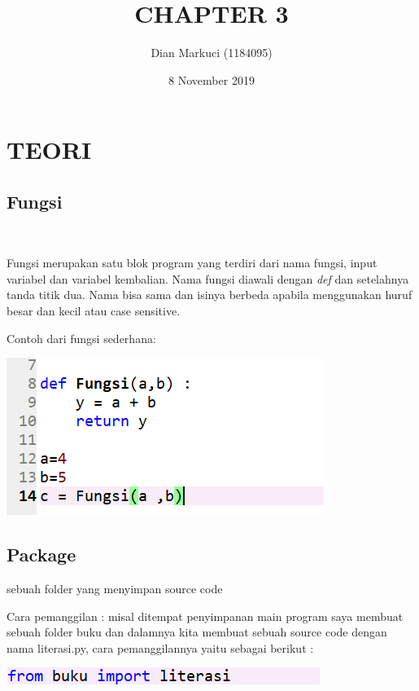 \documentclass{article}
\title{CHAPTER 3}
\author{Dian Markuci (1184095)}
\date{8 November 2019}
\begin{document}
\maketitle

\section{TEORI}
\subsection{Fungsi}\\
\item Fungsi merupakan satu blok program yang terdiri dari nama fungsi, input variabel dan variabel kembalian. Nama fungsi diawali dengan \textit{def} dan setelahnya tanda titik dua. Nama bisa sama dan isinya berbeda apabila menggunakan huruf besar dan kecil atau case sensitive.\\

\item  Contoh dari fungsi sederhana:
\begin{center}
    \includegraphics[width=8cm\textwidth]{figure/fungsi1.png}
\end{center}

\subsection{Package}
\item sebuah folder yang menyimpan source code
\item Cara pemanggilan :
 misal ditempat penyimpanan main program saya membuat sebuah folder buku dan dalamnya kita membuat sebuah source code dengan nama literasi.py, cara pemanggilannya yaitu sebagai berikut :
 
 \begin{center}
     \includegraphics[width=8cm\textwidth]{figure/package.png}
 \end{center}
\end{document}
